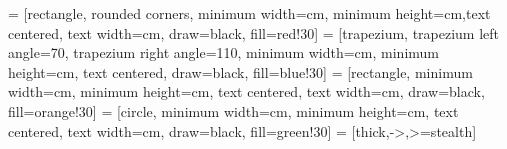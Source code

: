  = [rectangle, rounded corners, minimum width=\tikzwidth cm, minimum height=\tikzheight cm,text centered, text width=\tikzwidth cm, draw=black, fill=red!30]
 = [trapezium, trapezium left angle=70, trapezium right angle=110, minimum width=\tikzwidth cm, minimum height=\tikzheight cm, text centered, draw=black, fill=blue!30]
 = [rectangle, minimum width=\tikzwidth cm, minimum height=\tikzheight cm, text centered, text width=\tikzwidth cm, draw=black, fill=orange!30]
 = [circle, minimum width=\tikzdec cm, minimum height=\tikzdec cm, text centered, text width=\tikzdec cm, draw=black, fill=green!30]
 = [thick,->,>=stealth]
\newcommand{\coordinates}[2]{
    \draw[very thin,color=gray] (0,0) grid (#1, #2);
    \draw[->] (0,0) -- (#1,0) coordinate (x axis);
    \draw[->] (0,0) -- (0,#2) coordinate (y axis);
\foreach \x/\xtext in {0,...,#1}
    \draw (\x cm,1pt) -- (\x cm,-1pt) node[anchor=north,fill=white] {$\xtext$};
\foreach \y/\ytext in {0,...,#2}
    \draw (1pt,\y cm) -- (-1pt,\y cm) node[anchor=east,fill=white] {$\ytext$};
}
\makeatletter
\let\@@magyar@captionfix\relax
\makeatother
\newcommand{\cmark}{\textcolor{blue}{\ding{51}}}
\newcommand{\xmark}{\textcolor{red} {\ding{55}}}
